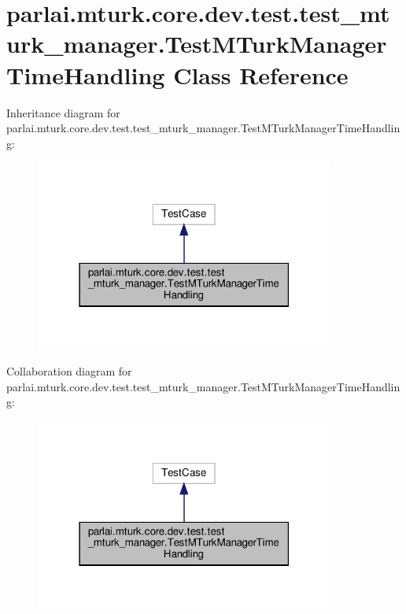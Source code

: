 \hypertarget{classparlai_1_1mturk_1_1core_1_1dev_1_1test_1_1test__mturk__manager_1_1TestMTurkManagerTimeHandling}{}\section{parlai.\+mturk.\+core.\+dev.\+test.\+test\+\_\+mturk\+\_\+manager.\+Test\+M\+Turk\+Manager\+Time\+Handling Class Reference}
\label{classparlai_1_1mturk_1_1core_1_1dev_1_1test_1_1test__mturk__manager_1_1TestMTurkManagerTimeHandling}


Inheritance diagram for parlai.\+mturk.\+core.\+dev.\+test.\+test\+\_\+mturk\+\_\+manager.\+Test\+M\+Turk\+Manager\+Time\+Handling\+:
\nopagebreak
\begin{figure}[H]
\begin{center}
\leavevmode
\includegraphics[width=279pt]{db/d3b/classparlai_1_1mturk_1_1core_1_1dev_1_1test_1_1test__mturk__manager_1_1TestMTurkManagerTimeHandling__inherit__graph}
\end{center}
\end{figure}


Collaboration diagram for parlai.\+mturk.\+core.\+dev.\+test.\+test\+\_\+mturk\+\_\+manager.\+Test\+M\+Turk\+Manager\+Time\+Handling\+:
\nopagebreak
\begin{figure}[H]
\begin{center}
\leavevmode
\includegraphics[width=279pt]{d3/dca/classparlai_1_1mturk_1_1core_1_1dev_1_1test_1_1test__mturk__manager_1_1TestMTurkManagerTimeHandling__coll__graph}
\end{center}
\end{figure}
